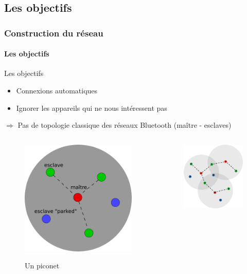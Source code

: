 \documentclass{beamer}
\begin{document}
    \subsection{Les objectifs}
    \begin{frame}
      \frametitle{Construction du réseau}
      \framesubtitle{Les objectifs}
      \begin{small}
        \begin{block}{Les objectifs}
          \begin{itemize}
            \item Connexions automatiques
            \item Ignorer les appareils qui ne nous intéressent pas
          \end{itemize}
          $ \Rightarrow $ Pas de topologie classique des réseaux Bluetooth (maître - esclaves)
          \begin{columns}
            \begin{column}{.5\textwidth}
              \begin{figure}
                \begin{center}
                  \includegraphics[width=.4\textwidth]{images/BluetoothPiconet.png}
                  \label{fig:piconet}
                  \caption{Un piconet}
                \end{center}
              \end{figure}
            \end{column}
            \begin{column}{.5\textwidth}
              \begin{figure}
                \begin{center}
                  \includegraphics[width=.4\textwidth]{images/BluetoothScatternet.png}

\end{center}
\end{figure}
\end{column}
\end{columns}
\end{block}
\end{small}
\end{frame}
\end{document}

